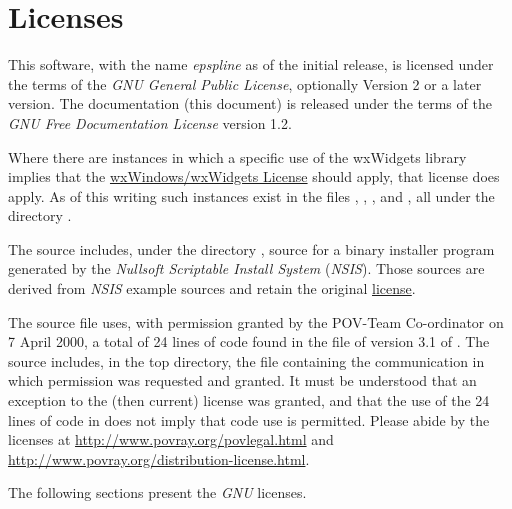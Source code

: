\chapter{Licenses}%
\label{chap:licenses}

	This software, with the name \emph{epspline} as of the initial
	release, is licensed under the terms of the \emph{GNU
	General Public License}, optionally Version 2 or a later version.
	The \IXpkg{} documentation (this document) is released under
	the terms of the
	\emph{GNU Free Documentation License} version 1.2.

	Where there are instances in which a specific use of the
	wxWidgets library implies that the
	\href{http://www.wxwidgets.org/about/newlicen.htm}{wxWindows/wxWidgets License}
	should apply, that license does apply.
	As of this writing such instances exist in the files
	, ,
	, and ,
	all under the directory .

	The \IXpkg{} source includes, under the directory
	, source for a binary installer program
	generated by the
	\emph{Nullsoft Scriptable Install System} (\emph{NSIS}). Those
	sources are derived from \emph{NSIS} example sources and
	retain the original
	\href{http://nsis.sourceforge.net/License}{license}.
	
	The source file  uses,
	with permission granted
	by the POV-Team Co-ordinator on 7 April 2000,
	a total of 24 lines of code found in
	the file  of version 3.1 of \IXpov{}.
	The \IXpkg{} source includes, in the  top
	directory, the file
	 containing the communication
	in which permission was requested and granted. It must be
	understood that an exception to the (then current) license
	was granted, and that the use of the 24 lines of code in
	\IXpkg{} does not imply that \IXpov{} code use is
	permitted. Please abide by the \IXpov{} licenses at
	\url{http://www.povray.org/povlegal.html} and
	\url{http://www.povray.org/distribution-license.html}.

	The following sections present the \emph{GNU} licenses.

